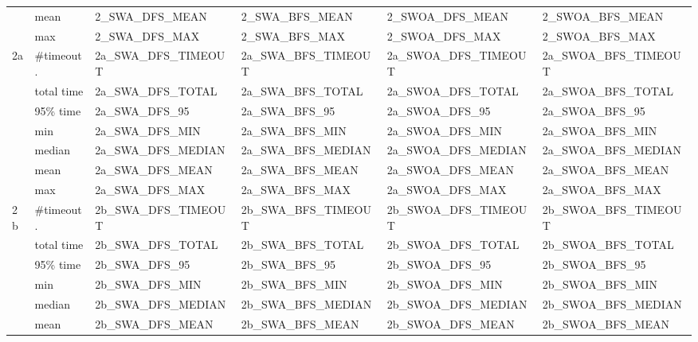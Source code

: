 \begin{table}
\begin{tabular}{|l|l|l|l|l|l|}
                      & mean       & 2_SWA_DFS_MEAN        & 2_SWA_BFS_MEAN        & 2_SWOA_DFS_MEAN       & 2_SWOA_BFS_MEAN        \\
                      & max        & 2_SWA_DFS_MAX         & 2_SWA_BFS_MAX         & 2_SWOA_DFS_MAX        & 2_SWOA_BFS_MAX         \\
\hline
\hline
\multirow{7}{*}{2a}   & \#timeout. & 2a_SWA_DFS_TIMEOUT    & 2a_SWA_BFS_TIMEOUT    & 2a_SWOA_DFS_TIMEOUT   & 2a_SWOA_BFS_TIMEOUT    \\
                      & total time & 2a_SWA_DFS_TOTAL      & 2a_SWA_BFS_TOTAL      & 2a_SWOA_DFS_TOTAL     & 2a_SWOA_BFS_TOTAL      \\
                      & 95\% time  & 2a_SWA_DFS_95         & 2a_SWA_BFS_95         & 2a_SWOA_DFS_95        & 2a_SWOA_BFS_95         \\
\cline{2-6}
                      & min        & 2a_SWA_DFS_MIN        & 2a_SWA_BFS_MIN        & 2a_SWOA_DFS_MIN       & 2a_SWOA_BFS_MIN        \\
                      & median     & 2a_SWA_DFS_MEDIAN     & 2a_SWA_BFS_MEDIAN     & 2a_SWOA_DFS_MEDIAN    & 2a_SWOA_BFS_MEDIAN     \\
                      & mean       & 2a_SWA_DFS_MEAN       & 2a_SWA_BFS_MEAN       & 2a_SWOA_DFS_MEAN      & 2a_SWOA_BFS_MEAN       \\
                      & max        & 2a_SWA_DFS_MAX        & 2a_SWA_BFS_MAX        & 2a_SWOA_DFS_MAX       & 2a_SWOA_BFS_MAX        \\
\hline
\hline
\multirow{7}{*}{2b}   & \#timeout. & 2b_SWA_DFS_TIMEOUT    & 2b_SWA_BFS_TIMEOUT    & 2b_SWOA_DFS_TIMEOUT   & 2b_SWOA_BFS_TIMEOUT    \\
                      & total time & 2b_SWA_DFS_TOTAL      & 2b_SWA_BFS_TOTAL      & 2b_SWOA_DFS_TOTAL     & 2b_SWOA_BFS_TOTAL      \\
                      & 95\% time  & 2b_SWA_DFS_95         & 2b_SWA_BFS_95         & 2b_SWOA_DFS_95        & 2b_SWOA_BFS_95         \\
\cline{2-6}
                      & min        & 2b_SWA_DFS_MIN        & 2b_SWA_BFS_MIN        & 2b_SWOA_DFS_MIN       & 2b_SWOA_BFS_MIN        \\
                      & median     & 2b_SWA_DFS_MEDIAN     & 2b_SWA_BFS_MEDIAN     & 2b_SWOA_DFS_MEDIAN    & 2b_SWOA_BFS_MEDIAN     \\
                      & mean       & 2b_SWA_DFS_MEAN       & 2b_SWA_BFS_MEAN       & 2b_SWOA_DFS_MEAN      & 2b_SWOA_BFS_MEAN       \\

\end{tabular}
\end{table}
